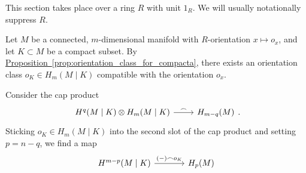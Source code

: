 \documentclass[main.tex]{subfiles}
\begin{document}
This section takes place over a ring \(R\) with unit \(1_{R}\). We will usually notationally suppress \(R\).

Let \(M\) be a connected, \(m\)-dimensional manifold with \(R\)-orientation \(x \mapsto o_{x}\), and let \(K \subset M\) be a compact subset. By \hyperref[prop:orientation_class_for_compacta]{Proposition~\ref*{prop:orientation_class_for_compacta}}, there exists an orientation class \(o_{K} \in H_{m}(M \mid K)\) compatible with the orientation \(o_{x}\).

Consider the cap product
\begin{equation*}
  \begin{tikzcd}
    H^{q}(M \mid K) \otimes H_{m}(M \mid K)
    \arrow[r, "\frown"]
    & H_{m-q}(M)
  \end{tikzcd}.
\end{equation*}
Sticking \(o_{K} \in H_{m}(M \mid K)\) into the second slot of the cap product and setting \(p = n-q\), we find a map
\begin{equation*}
  \begin{tikzcd}[column sep=large]
    H^{m - p}(M \mid K)
    \arrow[r, "(-) \frown o_{K}"]
    & H_{p}(M)
  \end{tikzcd}
\end{equation*}
\end{document}
